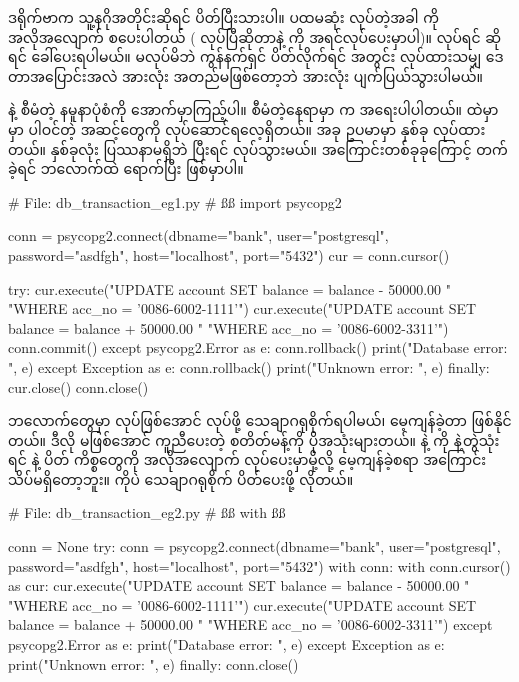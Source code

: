 ဒရိုက်ဗာက သူ့နဂိုအတိုင်းဆိုရင်  ပိတ်ပြီးသားပါ။ ပထမဆုံး  လုပ်တဲ့အခါ  ကို အလိုအလျောက် စပေးပါတယ် ( လုပ်ပြီဆိုတာနဲ့  ကို အရင်လုပ်ပေးမှာပါ)။  လုပ်ရင် \fEn{,}  ဆိုရင်  ခေါ်ပေးရပါမယ်။  မလုပ်မိဘဲ ကွန်နက်ရှင် ပိတ်လိုက်ရင်  အတွင်း လုပ်ထားသမျှ ဒေတာအပြောင်းအလဲ အားလုံး အတည်မဖြစ်တော့ဘဲ အားလုံး ပျက်ပြယ်သွားပါမယ်။ 

 နဲ့  စီမံတဲ့ နမူနာပုံစံကို အောက်မှာကြည့်ပါ။  စီမံတဲ့နေရာမှာ  က အရေးပါပါတယ်။  ထဲမှာ  မှာ ပါဝင်တဲ့ အဆင့်တွေကို လုပ်ဆောင်ရလေ့ရှိတယ်။ အခု ဥပမာမှာ  နှစ်ခု လုပ်ထားတယ်။ နှစ်ခုလုံး ပြဿနာမရှိဘဲ ပြီးရင်  လုပ်သွားမယ်။ အကြောင်းတစ်ခုခုကြောင့်  တက်ခဲ့ရင်  ဘလောက်ထဲ ရောက်ပြီး  ဖြစ်မှာပါ။
%
\begin{py}
# File: db_transaction_eg1.py
# ßß
import psycopg2

conn = psycopg2.connect(dbname="bank", user="postgresql", 
                        password="asdfgh", host="localhost", port="5432")
cur = conn.cursor()

try:
    cur.execute("UPDATE account SET balance = balance - 50000.00 "
                "WHERE acc_no = '0086-6002-1111'")
    cur.execute("UPDATE account SET balance = balance + 50000.00 "
                "WHERE acc_no = '0086-6002-3311'")
    conn.commit()
except psycopg2.Error as e:
    conn.rollback()
    print("Database error: ", e)
except Exception as e:
    conn.rollback()
    print("Unknown error: ", e)
finally:
    cur.close()
    conn.close()
\end{py}
%
 ဘလောက်တွေမှာ  လုပ်ဖြစ်အောင် လုပ်ဖို့ သေချာဂရုစိုက်ရပါမယ်၊ မေ့ကျန်ခဲ့တာ ဖြစ်နိုင်တယ်။ ဒီလို မဖြစ်အောင် ကူညီပေးတဲ့  စတိတ်မန့်ကို ပိုအသုံးများတယ်။  နဲ့  ကို  နဲ့တွဲသုံးရင်  နဲ့  ပိတ် ကိစ္စတွေကို အလိုအလျောက် လုပ်ပေးမှာမို့လို့  မေ့ကျန်ခဲ့စရာ အကြောင်း သိပ်မရှိတော့ဘူး။  ကိုပဲ သေချာဂရုစိုက် ပိတ်ပေးဖို့ လိုတယ်။

%
\begin{py}
# File: db_transaction_eg2.py
# ßß with ßß

conn = None
try:
    conn = psycopg2.connect(dbname="bank", user="postgresql", 
                            password="asdfgh", host="localhost", port="5432")
    with conn:
        with conn.cursor() as cur:
            cur.execute("UPDATE account SET balance = balance - 50000.00 "
                        "WHERE acc_no = '0086-6002-1111'")
            cur.execute("UPDATE account SET balance = balance + 50000.00 "
                        "WHERE acc_no = '0086-6002-3311'")
except psycopg2.Error as e:
    print("Database error: ", e)
except Exception as e:
    print("Unknown error: ", e)
finally:
    conn.close()
\end{py}
%


